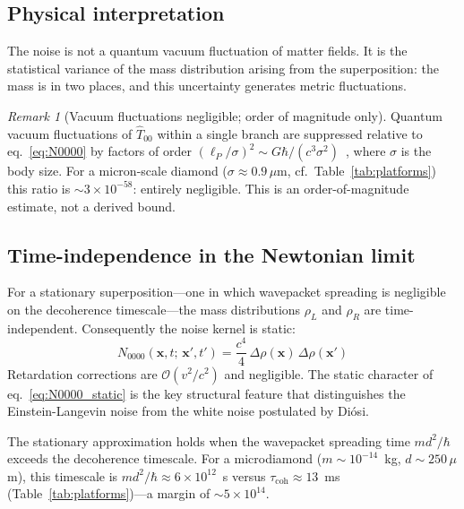 \documentclass[12pt,a4paper]{article}
\theoremstyle{remark}
\newtheorem{remark}{Remark}
\begin{document}
\subsection{Physical interpretation}
\label{sec:physical_interpretation}

The noise is not a quantum vacuum fluctuation of matter fields. It is the statistical
variance of the mass distribution arising from the superposition: the mass is in two
places, and this uncertainty generates metric fluctuations.

\begin{remark}[Vacuum fluctuations negligible; order of magnitude only]
\label{rem:vacuum}
Quantum vacuum fluctuations of $\hat{T}_{00}$ within a single branch are suppressed
relative to eq.~\eqref{eq:N0000} by factors of order
$(\ell_P/\sigma)^2 \sim G\hbar/(c^3\sigma^2)$~\cite{phillips_hu}, where $\sigma$ is the
body size. For a micron-scale diamond ($\sigma \approx 0.9\,\mu\text{m}$, cf.\
Table~\ref{tab:platforms}) this ratio is $\sim 3\times10^{-58}$: entirely negligible.
This is an order-of-magnitude estimate, not a derived bound.
\end{remark}

\subsection{Time-independence in the Newtonian limit}

For a stationary superposition---one in which wavepacket spreading is negligible on the
decoherence timescale---the mass distributions $\rho_L$ and $\rho_R$ are
time-independent. Consequently the noise kernel is static:
\begin{equation}
N_{0000}(\mathbf{x},t;\,\mathbf{x}',t') = \frac{c^4}{4}\,\Delta\rho(\mathbf{x})\,\Delta\rho(\mathbf{x}')
\label{eq:N0000_static}
\end{equation}
Retardation corrections are $\mathcal{O}(v^2/c^2)$ and negligible. The static character
of eq.~\eqref{eq:N0000_static} is the key structural feature that distinguishes the
Einstein-Langevin noise from the white noise postulated by Di\'osi.

The stationary approximation holds when the wavepacket spreading time $md^2/\hbar$ exceeds
the decoherence timescale. For a microdiamond ($m \sim 10^{-14}$~kg, $d \sim 250\,\mu$m),
this timescale is $md^2/\hbar \approx 6\times10^{12}$~s versus $\tau_{\text{coh}} \approx
13$~ms (Table~\ref{tab:platforms})---a margin of $\sim 5\times10^{14}$.
\end{document}
